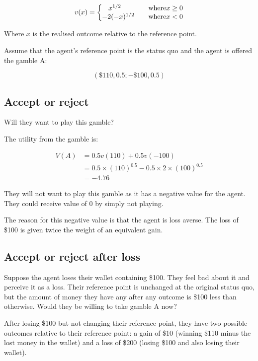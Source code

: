 \documentclass[
  letterpaper,
  DIV=11,
  numbers=noendperiod]{scrreprt}
\begin{document}
\[
v(x)=\left\{\begin{matrix}
x^{1/2} \qquad &\textrm{where} \space x \geq 0\\
-2(-x)^{1/2} \quad &\textrm{where} \space x < 0 
\end{matrix}\right.
\]

Where \(x\) is the realised outcome relative to the reference point.

Assume that the agent's reference point is the status quo and the agent
is offered the gamble A:

\[(\$110, 0.5; −\$100, 0.5)\]

\hypertarget{accept-or-reject}{%
\subsection{Accept or reject}\label{accept-or-reject}}

Will they want to play this gamble?

The utility from the gamble is:

\begin{align*}
V(A)&=0.5v(110)+0.5v(-100) \\
&=0.5\times (110)^{0.5}-0.5\times 2\times (100)^{0.5} \\
&=-4.76
\end{align*}

They will not want to play this gamble as it has a negative value for
the agent. They could receive value of 0 by simply not playing.

The reason for this negative value is that the agent is loss averse. The
loss of \$100 is given twice the weight of an equivalent gain.

\hypertarget{accept-or-reject-after-loss}{%
\subsection{Accept or reject after
loss}\label{accept-or-reject-after-loss}}

Suppose the agent loses their wallet containing \$100. They feel bad
about it and perceive it as a loss. Their reference point is unchanged
at the original status quo, but the amount of money they have any after
any outcome is \$100 less than otherwise. Would they be willing to take
gamble A now?

After losing \$100 but not changing their reference point, they have two
possible outcomes relative to their reference point: a gain of \$10
(winning \$110 minus the lost money in the wallet) and a loss of \$200
(losing \$100 and also losing their wallet).
\end{document}
